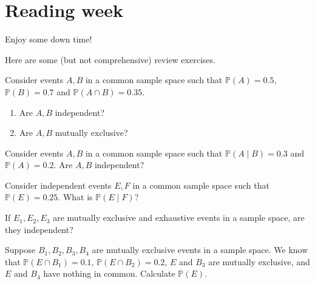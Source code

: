 \documentclass[../main.tex]{subfiles}
\begin{document}
 \section{Reading week}

Enjoy some down time! 

Here are some (but not comprehensive) review exercises.  

\begin{example}
  Consider events \(A,B\) in a common sample space such that \(\mathbb{P}(A) = 0.5\), \(\mathbb{P}(B) = 0.7\) and \(\mathbb{P}(A \cap B) = 0.35\).  

  \begin{enumerate}
    \item Are \(A,B\) independent?
    \item Are \(A,B\) mutually exclusive? 
  \end{enumerate}

\end{example}

\begin{example}
  Consider events \(A,B\) in a common sample space such that \(\mathbb{P}(A \mid B) = 0.3\) and \(\mathbb{P}(A) = 0.2\). Are \(A,B\) independent?

\end{example}

\begin{example}
  Consider independent events \(E,F\) in a common sample space such that \(\mathbb{P}(E) = 0.25\). What is \(\mathbb{P}(E \mid F)\)?

\end{example}

\begin{example}
  If \(E_{1},E_{2},E_{3}\) are mutually exclusive and exhaustive events in a sample space, are they independent?
\end{example}

\begin{example}
  Suppose \(B_{1},B_{2},B_{3},B_{4}\) are mutually exclusive events in a sample space. We know that \(\mathbb{P}(E \cap B_{1}) = 0.1\), \(\mathbb{P}(E \cap B_{2}) = 0.2\), \(E\) and \(B_{3}\) are mutually exclusive, and \(E\) and \(B_{4}\) have nothing in common. Calculate \(\mathbb{P}(E)\).

\end{example}
\clearpage
\end{document}
